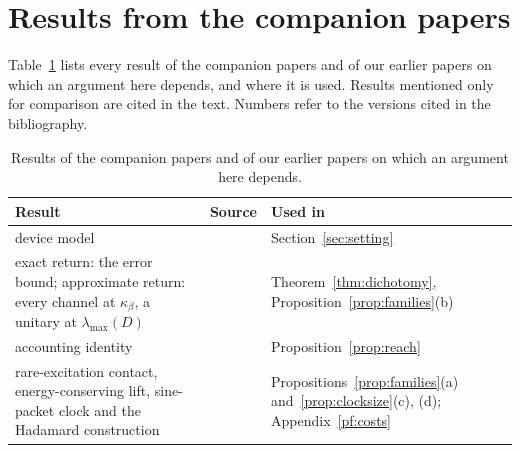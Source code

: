\documentclass[11pt]{article}
\theoremstyle{definition}
\theoremstyle{remark}
\newcommand{\Trt}{\kappa_\beta}
\begin{document}
\section{Results from the companion papers}\label{app:companions}

Table~\ref{tab:companions} lists every result of the companion papers and of our earlier papers on which an argument here depends, and where it is used. Results mentioned only for comparison are cited in the text. Numbers refer to the versions cited in the bibliography.

\begin{table}[ht]
\centering\small
\begin{tabular}{@{}>{\raggedright\arraybackslash}p{}>{\raggedright\arraybackslash}p{}>{\raggedright\arraybackslash}p{}@{}}
\toprule
Result & Source & Used in\\
\midrule
device model & \cite[Sec.~2]{SaveWork} & Section~\ref{sec:setting}\\
exact return: the error bound; approximate return: every channel at $\Trt$, a unitary at $\lambda_{\max}(D)$ & \cite[Prop.~10, Thm.~11]{SaveWork} & Theorem~\ref{thm:dichotomy}, Proposition~\ref{prop:families}(b)\\
accounting identity & \cite[Lemma~4]{SaveWork} & Proposition~\ref{prop:reach}\\
rare-excitation contact, energy-conserving lift, sine-packet clock and the Hadamard construction & \cite[App.~D]{SaveWork} & Propositions~\ref{prop:families}(a) and~\ref{prop:clocksize}(c), (d); Appendix~\ref{pf:costs}\\
\bottomrule
\end{tabular}
\caption{Results of the companion papers and of our earlier papers on which an argument here depends.}\label{tab:companions}
\end{table}



\end{document}
